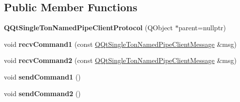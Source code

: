 \subsection*{Public Member Functions}
\begin{DoxyCompactItemize}
\item 
\mbox{\label{class_q_qt_single_ton_named_pipe_client_protocol_a9e3255bd8cbbfbad31896b2ea5314cd1}} 
{\bfseries Q\+Qt\+Single\+Ton\+Named\+Pipe\+Client\+Protocol} (Q\+Object $\ast$parent=nullptr)
\item 
\mbox{\label{class_q_qt_single_ton_named_pipe_client_protocol_af0f5896f96134e1437b743984d72fa2c}} 
void {\bfseries recv\+Command1} (const \mbox{\hyperlink{class_q_qt_single_ton_named_pipe_client_message}{Q\+Qt\+Single\+Ton\+Named\+Pipe\+Client\+Message}} \&msg)
\item 
\mbox{\label{class_q_qt_single_ton_named_pipe_client_protocol_affb051a3bd05da803b58c9244dbab164}} 
void {\bfseries recv\+Command2} (const \mbox{\hyperlink{class_q_qt_single_ton_named_pipe_client_message}{Q\+Qt\+Single\+Ton\+Named\+Pipe\+Client\+Message}} \&msg)
\item 
\mbox{\label{class_q_qt_single_ton_named_pipe_client_protocol_a17f077be8df874e76f16c1920d8ff022}} 
void {\bfseries send\+Command1} ()
\item 
\mbox{\label{class_q_qt_single_ton_named_pipe_client_protocol_a82afa0c9e6b93d30b1eba6124777414e}} 
void {\bfseries send\+Command2} ()
\end{DoxyCompactItemize}
